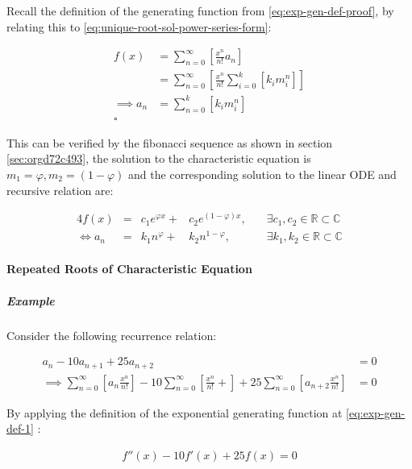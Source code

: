 \documentclass[11pt]{article}
\begin{document}
Recall the definition of the generating function from \ref{eq:exp-gen-def-proof}, by relating this to \eqref{eq:unique-root-sol-power-series-form}:

\begin{align}
    f{\left({ x }\right)} &= \sum^{\infty}_{n= 0}   {\left[{  \frac{x^n}{n!} a_n }\right]} \nonumber \\
&= \sum^{\infty}_{n= 0} {\left[{ \frac{x^n}{n!}  \sum^{k}_{i=0}   {\left[{ k_im^n_i }\right]}  }\right]}  \nonumber \\
      \implies  a_n &= \sum^{k}_{n= 0} {\left[{ k_im_i^n }\right]}     \nonumber \\ \nonumber
\square
\end{align}

This can be verified by the fibonacci sequence as shown in section \ref{sec:orgd72c493}, the solution to the characteristic equation is \(m_1 = \varphi, m_2 = {\left({ 1-\varphi }\right)}\) and the corresponding solution to the linear ODE and recursive relation are:

\begin{alignat}{4}
    f{\left({ x }\right)} &= &c_1 e^{\varphi x} +  &c_2 e^{{\left({ 1-\varphi }\right)} x}, \quad &\exists c_1, c_2 \in \mathbb{R} \subset \mathbb{C} \nonumber \\
    \iff  a_n &= &k_1 n^{\varphi} +  &k_2 n^{1- \varphi}, &\exists k_1, k_2 \in \mathbb{R} \subset \mathbb{C} \nonumber
\end{alignat}

\paragraph{Repeated Roots of Characteristic Equation}
\label{sec:org031646c}
\subparagraph{Example}
\label{sec:orgb43251d}
Consider the following recurrence relation:

\begin{align}
    a_n -  10a_{n+ 1} +  25a_{n+  2}&= 0 \label{eq:hom-repeated-roots-recurrence} \\
    \implies  \sum^{\infty}_{n= 0}   {\left[{ a_n \frac{x^n}{n!} }\right]} - 10 \sum^{\infty}_{n= 0}   {\left[{ \frac{x^n}{n!}+    }\right]} + 25 \sum^{\infty}_{n= 0 }   {\left[{  a_{n+  2 }\frac{x^n}{n!} }\right]}&= 0 \nonumber
\end{align}

By applying the definition of the exponential generating function at \eqref{eq:exp-gen-def-1} :

\begin{align}
    f''{\left({ x }\right)}- 10f'{\left({ x }\right)}+  25f{\left({ x }\right)}= 0 \nonumber \label{eq:rep-roots-func-ode}
\end{align}
\end{document}

